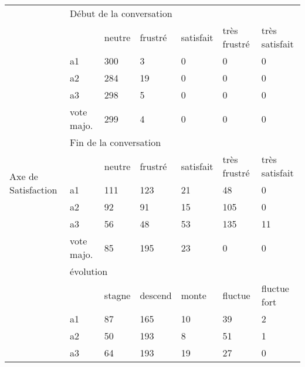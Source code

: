 \begin{table}
  \centering
\begin{tabular}{|l|l|l|l|l|l|l|}
\hline
\multirow{18}{*}{Axe de Satisfaction} & \multicolumn{6}{l|}{Début de la conversation}                                      \\ \cline{2-7}
      &                  & neutre & frustré & satisfait & très frustré & très satisfait    \\ \cline{2-7}
      & a1               & 300    & 3       & 0         & 0            & 0                 \\ \cline{2-7}
      & a2               & 284    & 19      & 0         & 0            & 0                 \\ \cline{2-7}
      & a3               & 298    & 5       & 0         & 0            & 0                 \\ \cline{2-7}
      & vote majo. & 299    & 4       & 0         & 0            & 0                 \\ \cline{2-7}
      & \multicolumn{6}{l|}{Fin de la conversation}                                        \\ \cline{2-7}
      &                  & neutre & frustré & satisfait & très frustré & très satisfait    \\ \cline{2-7}
      & a1               & 111    & 123     & 21        & 48           & 0                 \\ \cline{2-7}
      & a2               & 92     & 91      & 15        & 105          & 0                 \\ \cline{2-7}
      & a3               & 56     & 48      & 53        & 135          & 11                \\ \cline{2-7}
      & vote majo. & 85     & 195     & 23        & 0            & 0                 \\ \cline{2-7}
      & \multicolumn{6}{l|}{évolution}                                                     \\ \cline{2-7}
      &                  & stagne & descend & monte     & fluctue      & fluctue fort \\ \cline{2-7}
      & a1               & 87     & 165     & 10        & 39           & 2                 \\ \cline{2-7}
      & a2               & 50     & 193     & 8         & 51           & 1                 \\ \cline{2-7}
      & a3               & 64     & 193     & 19        & 27           & 0                 \\ \cline{2-7}

\end{tabular}
\end{table}
